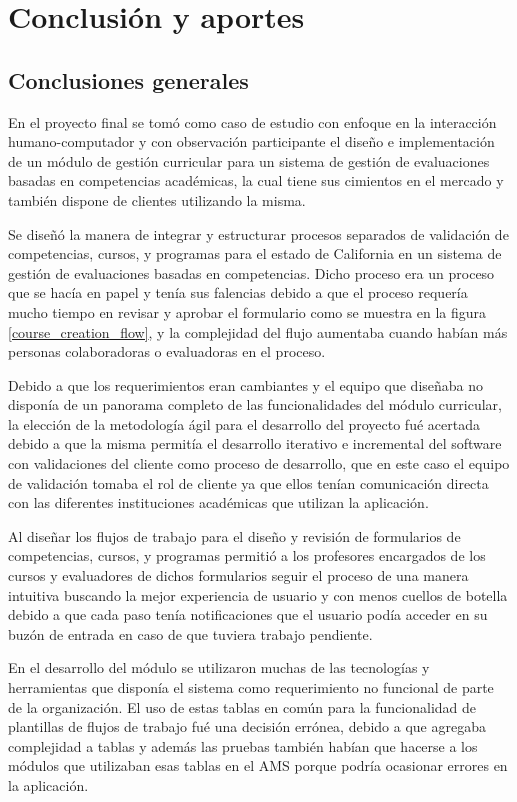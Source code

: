 
\chapter{Conclusión y aportes} \label{capitulo8} 

\section{Conclusiones generales}
En el proyecto final se tomó como caso de estudio con enfoque en la interacción humano-computador y con observación participante el diseño e implementación de un módulo de gestión curricular para un sistema de gestión de evaluaciones basadas en competencias académicas, la cual tiene sus cimientos en el mercado y también dispone de clientes utilizando la misma. 

Se diseñó la manera de integrar y estructurar procesos separados de validación de competencias, cursos, y programas para el estado de California en un sistema de gestión de evaluaciones basadas en competencias. Dicho proceso era un proceso que se hacía en papel y tenía sus falencias debido a que el proceso requería mucho tiempo en revisar y aprobar el formulario como se muestra en la figura \ref{course_creation_flow}, y la complejidad del flujo aumentaba cuando habían más personas colaboradoras o evaluadoras en el proceso.

Debido a que los requerimientos eran cambiantes y el equipo que diseñaba no disponía de un panorama completo de las funcionalidades del módulo curricular, la elección de la metodología ágil para el desarrollo del proyecto fué acertada debido a que la misma permitía el desarrollo iterativo e incremental del software con validaciones del cliente como proceso de desarrollo, que en este caso el equipo de validación tomaba el rol de cliente ya que ellos tenían comunicación directa con las diferentes instituciones académicas que utilizan la aplicación.

Al diseñar los flujos de trabajo para el diseño y revisión de formularios de competencias, cursos, y programas permitió a los profesores encargados de los cursos y evaluadores de dichos formularios seguir el proceso de una manera intuitiva buscando la mejor experiencia de usuario y con menos cuellos de botella debido a que cada paso tenía notificaciones que el usuario podía acceder en su buzón de entrada en caso de que tuviera trabajo pendiente.

En el desarrollo del módulo se utilizaron muchas de las tecnologías y herramientas que disponía el sistema como requerimiento no funcional de parte de la organización. El uso de estas tablas en común para la funcionalidad de plantillas de flujos de trabajo fué una decisión errónea, debido a que agregaba complejidad a tablas y además las pruebas también habían que hacerse a los módulos que utilizaban esas tablas en el AMS porque podría ocasionar errores en la aplicación. 

